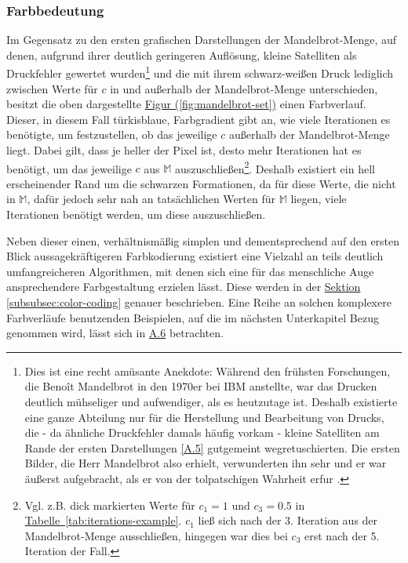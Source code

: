 \subsubsection{Farbbedeutung}\label{subsubsec:color-meaning}

Im Gegensatz zu den ersten grafischen Darstellungen der Mandelbrot-Menge,
auf denen, aufgrund ihrer deutlich geringeren Auflösung,
kleine Satelliten als Druckfehler gewertet wurden\footnote{
  Dies ist eine recht amüsante Anekdote: Während den frühsten Forschungen,
  die Benoît Mandelbrot in den 1970er bei IBM anstellte, war das Drucken deutlich
  mühseliger und aufwendiger, als es heutzutage ist.
  Deshalb existierte eine ganze Abteilung nur für die Herstellung und Bearbeitung von
  Drucks, die - da ähnliche Druckfehler damals häufig vorkam - kleine Satelliten
  am Rande der ersten Darstellungen \hyperref[app:5]{[A.5]} gutgemeint wegretuschierten.
  Die ersten Bilder, die Herr Mandelbrot also erhielt, verwunderten ihn sehr und
  er war äußerst aufgebracht, als er von der tolpatschigen Wahrheit erfur
  \cite{numberphile_whats_2019}.
}
und die mit ihrem schwarz-weißen Druck lediglich zwischen Werte für $c$ in
und außerhalb der Mandelbrot-Menge unterschieden,
besitzt die oben dargestellte
\hyperref[fig:mandelbrot-set]{Figur (\ref{fig:mandelbrot-set})}
einen Farbverlauf.
Dieser, in diesem Fall türkisblaue, Farbgradient gibt an,
wie viele Iterationen es benötigte,
um festzustellen, ob das jeweilige $c$ außerhalb der Mandelbrot-Menge liegt.
Dabei gilt, dass je heller der Pixel ist, desto mehr Iterationen hat es benötigt,
um das jeweilige $c$ aus $\mathbb{M}$ auszuschließen\footnote{
  Vgl. z.B. dick markierten Werte für $c_1 = 1 \text{ und } c_3 = 0.5$ in
  \hyperref[tab:iterations-example]{Tabelle~\ref{tab:iterations-example}}.
  $c_1$ ließ sich nach der 3. Iteration aus der Mandelbrot-Menge ausschließen,
  hingegen war dies bei $c_3$ erst nach der 5. Iteration der Fall.
}.
Deshalb existiert ein hell erscheinender Rand um die schwarzen Formationen,
da für diese Werte, die nicht in $\mathbb{M}$, dafür jedoch sehr nah
an tatsächlichen Werten für $\mathbb{M}$ liegen,
viele Iterationen benötigt werden, um diese auszuschließen.

Neben dieser einen, verhältnismäßig simplen und dementsprechend auf den ersten
Blick aussagekräftigeren Farbkodierung existiert eine Vielzahl an teils deutlich
umfangreicheren Algorithmen, mit denen sich eine für das menschliche Auge
ansprechendere Farbgestaltung erzielen lässt.
Diese werden in der \hyperref[subsubsec:color-coding]{Sektion \ref{subsubsec:color-coding}}
genauer beschrieben.
Eine Reihe an solchen komplexere Farbverläufe benutzenden Beispielen,
auf die im nächsten Unterkapitel Bezug genommen wird,
lässt sich in \hyperref[app:6]{A.6} betrachten.

